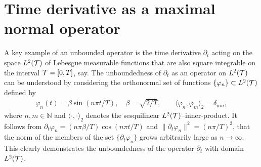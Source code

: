 \documentclass[amsa]{ipart}
\begin{document}
\section{Time derivative as a maximal normal
  operator}\label{app:Time_Derivative}
%
A key example of an unbounded operator is the time derivative
$\partial_t$ acting on the space $L^2(\mathcal{T})$ of Lebesgue measurable functions
that are also square integrable on the interval $\mathcal{T}=[0,T]$, say. The
unboundedness of $\partial_t$ as an operator on $L^2(\mathcal{T})$ can be 
understood by considering the orthonormal set of functions
$\{\varphi_n\}\subset L^2(\mathcal{T})$ defined by     
%
\begin{align}\label{eq:Orthonormal}
  \varphi_n(t)=\beta\sin(n\pi t/T), \quad
  \beta=\sqrt{2/T},
  \qquad
  \langle\varphi_n,\varphi_m\rangle_2=\delta_{nm},
\end{align}
%
where $n,m\in\mathbb{N}$ and $\langle\cdot,\cdot\rangle_2$ denotes the sesquilinear
$L^2(\mathcal{T})$--inner-product. It follows from $\partial_t\varphi_n=(n\pi\beta/T)\cos(n\pi t/T)$
and $\|\partial_t\varphi_n\|^2=(n\pi/T)^2$, that the norm of the members of the set
$\{\partial_t\varphi_n\}$ grows arbitrarily large as $n\to\infty$. This clearly demonstrates
the unboundedness of the operator $\partial_t$ with domain $L^2(\mathcal{T})$.
\end{document}
